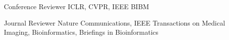 

\begin{cvskills}
  \cvskill
    {Conference Reviewer}
    {ICLR, CVPR, IEEE BIBM}

  \cvskill
    {Journal Reviewer}
    {Nature Communications, IEEE Transactions on Medical Imaging, Bioinformatics, Briefings in Bioinformatics}
\end{cvskills}
